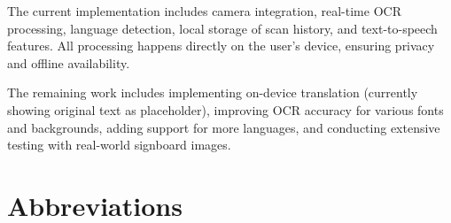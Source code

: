 \documentclass[12pt,a4paper]{report}
\begin{document}
The current implementation includes camera integration, real-time OCR processing, language detection, local storage of scan history, and text-to-speech features. All processing happens directly on the user's device, ensuring privacy and offline availability.

The remaining work includes implementing on-device translation (currently showing original text as placeholder), improving OCR accuracy for various fonts and backgrounds, adding support for more languages, and conducting extensive testing with real-world signboard images.


\tableofcontents
\clearpage


\listoffigures
\clearpage


\listoftables
\clearpage


\chapter*{Abbreviations}
\end{document}
